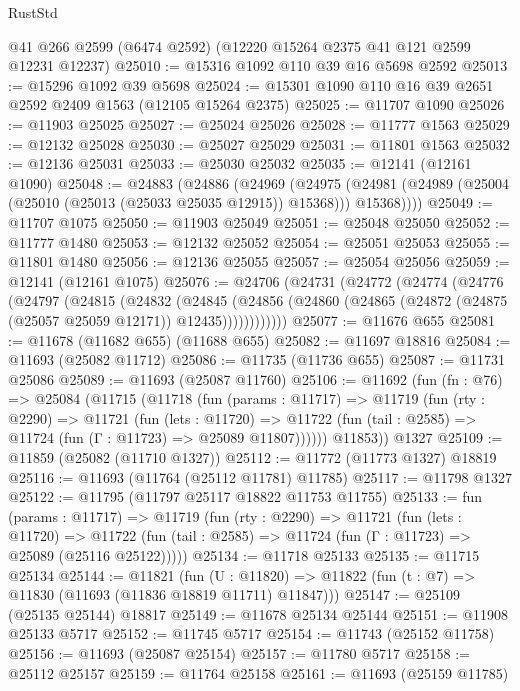 \begin{lexlean}{RustStd}
\begin{coremodule}
    @41
    @266
    @2599
    (@6474 @2592)
    (@12220 @15264 @2375 @41 @121 @2599 @12231 @12237)
@25010 := @15316 @1092 @110 @39 @16 @5698 @2592
@25013 := @15296 @1092 @39 @5698
@25024 := @15301 @1090 @110 @16 @39 @2651 @2592 @2409 @1563 (@12105 @15264 @2375)
@25025 := @11707 @1090
@25026 := @11903 @25025
@25027 := @25024 @25026
@25028 := @11777 @1563
@25029 := @12132 @25028
@25030 := @25027 @25029
@25031 := @11801 @1563
@25032 := @12136 @25031
@25033 := @25030 @25032
@25035 := @12141 (@12161 @1090)
@25048 := @24883
    (@24886
      (@24969
        (@24975 (@24981 (@24989 (@25004 (@25010 (@25013 (@25033 @25035 @12915)) @15368))) @15368))))
@25049 := @11707 @1075
@25050 := @11903 @25049
@25051 := @25048 @25050
@25052 := @11777 @1480
@25053 := @12132 @25052
@25054 := @25051 @25053
@25055 := @11801 @1480
@25056 := @12136 @25055
@25057 := @25054 @25056
@25059 := @12141 (@12161 @1075)
@25076 := @24706
    (@24731
      (@24772
        (@24774
          (@24776
            (@24797
              (@24815
                (@24832
                  (@24845
                    (@24856
                      (@24860 (@24865 (@24872 (@24875 (@25057 @25059 @12171)) @12435))))))))))))
@25077 := @11676 @655
@25081 := @11678 (@11682 @655) (@11688 @655)
@25082 := @11697 @18816
@25084 := @11693 (@25082 @11712)
@25086 := @11735 (@11736 @655)
@25087 := @11731 @25086
@25089 := @11693 (@25087 @11760)
@25106 := @11692
    (fun (fn : @76) =>
    @25084
      (@11715
        (@11718
          (fun (params : @11717) =>
          @11719
            (fun (rty : @2290) =>
            @11721
              (fun (lets : @11720) =>
              @11722 (fun (tail : @2585) => @11724 (fun (Γ : @11723) => @25089 @11807))))))
        @11853))
    @1327
@25109 := @11859 (@25082 (@11710 @1327))
@25112 := @11772 (@11773 @1327) @18819
@25116 := @11693 (@11764 (@25112 @11781) @11785)
@25117 := @11798 @1327
@25122 := @11795 (@11797 @25117 @18822 @11753 @11755)
@25133 := fun (params : @11717) =>
  @11719
    (fun (rty : @2290) =>
    @11721
      (fun (lets : @11720) =>
      @11722 (fun (tail : @2585) => @11724 (fun (Γ : @11723) => @25089 (@25116 @25122)))))
@25134 := @11718 @25133
@25135 := @11715 @25134
@25144 := @11821
    (fun (U : @11820) => @11822 (fun (t : @7) => @11830 (@11693 (@11836 @18819 @11711) @11847)))
@25147 := @25109 (@25135 @25144) @18817
@25149 := @11678 @25134 @25144
@25151 := @11908 @25133 @5717
@25152 := @11745 @5717
@25154 := @11743 (@25152 @11758)
@25156 := @11693 (@25087 @25154)
@25157 := @11780 @5717
@25158 := @25112 @25157
@25159 := @11764 @25158
@25161 := @11693 (@25159 @11785)

\end{coremodule}
\end{lexlean}

